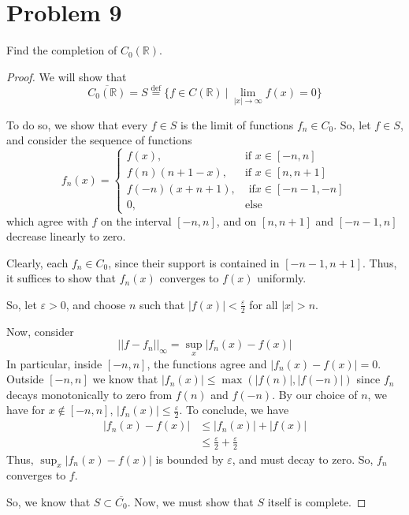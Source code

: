 \documentclass[fontsize=11pt]{scrartcl} %
\numberwithin{equation}{section} %
\numberwithin{figure}{section} %
\numberwithin{table}{section} %
\newcommand{\R}{\mathbb{R}}
\begin{document}
\section*{Problem 9}
Find the completion of $C_0(\R)$.
\\
\begin{proof}
    We will show that 
    \[
        \overline{C_0(\R)} = S \stackrel{\textrm{def}}{=} \{f\in C(\R)\ |\ \lim_{|x|\to\infty}f(x) = 0\}
    \]

    To do so, we show that every $f\in S$ is the limit of functions $f_n\in
    C_0$. So, let $f\in S$, and consider the sequence of functions
    \[
        f_n(x) = 
        \begin{cases}
            f(x), &\textrm{if }x\in[-n,n]\\
            f(n)(n+1-x), &\textrm{if }x\in[n,n+1]\\
            f(-n)(x+n+1), &\textrm{ if}x\in[-n-1,-n]\\
            0, &\textrm{else}
        \end{cases}
    \]
    which agree with $f$ on the interval $[-n,n]$, and on $[n,n+1]$ and
    $[-n-1,n]$ decrease linearly to zero.

    Clearly, each $f_n\in C_0$, since their support is contained in
    $[-n-1,n+1]$. Thus, it suffices to show that $f_n(x)$ converges to $f(x)$
    uniformly.

    So, let $\varepsilon >0$, and choose $n$ such that $|f(x)|
    <\frac{\varepsilon}{2}$ for
    all $|x| > n$.

    Now, consider 
    \[
        ||f-f_n||_{\infty} = \sup_x |f_n(x)-f(x)|
    \]
    In particular, inside $[-n,n]$, the functions agree and $|f_n(x)-f(x)|=0$.
    Outside $[-n,n]$ we know that $|f_n(x)| \leq \max(|f(n)|,|f(-n)|)$ since
    $f_n$ decays monotonically to zero from $f(n)$ and $f(-n)$. By our choice of
    $n$, we have for $x\not\in[-n,n]$, $|f_n(x)|\leq \frac{\varepsilon}{2}$.
    To conclude, we have
    \[
    \begin{aligned}
        |f_n(x) - f(x)| &\leq |f_n(x)|+|f(x)|\\
                        &\leq \frac{\varepsilon}{2} + \frac{\varepsilon}{2}
    \end{aligned}
    \]
    Thus, $\sup_x |f_n(x) - f(x)|$ is bounded by $\varepsilon$, and must decay
    to zero. So, $f_n$ converges to $f$.

    So, we know that $S\subset \overline{C_0}$. Now, we must show that $S$
    itself is complete.


\end{proof}
\end{document}
